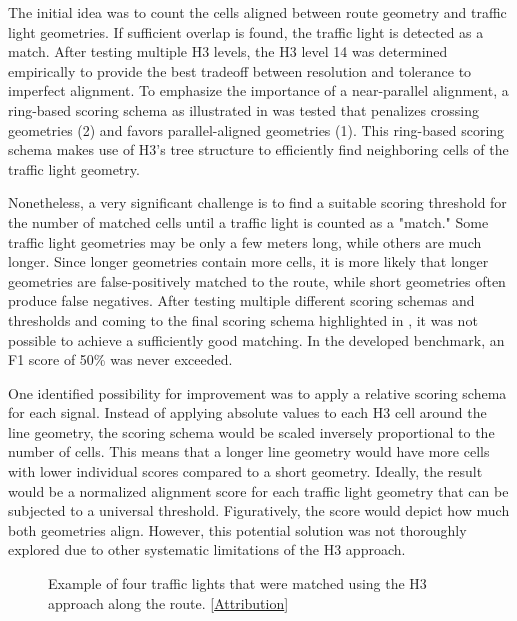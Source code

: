 The initial idea was to count the cells aligned between route geometry and traffic light geometries. If sufficient overlap is found, the traffic light is detected as a match. After testing multiple H3 levels, the H3 level 14 was determined empirically to provide the best tradeoff between resolution and tolerance to imperfect alignment. To emphasize the importance of a near-parallel alignment, a ring-based scoring schema as illustrated in  was tested that penalizes crossing geometries (2) and favors parallel-aligned geometries (1). This ring-based scoring schema makes use of H3's tree structure to efficiently find neighboring cells of the traffic light geometry.

Nonetheless, a very significant challenge is to find a suitable scoring threshold for the number of matched cells until a traffic light is counted as a "match." Some traffic light geometries may be only a few meters long, while others are much longer. Since longer geometries contain more cells, it is more likely that longer geometries are false-positively matched to the route, while short geometries often produce false negatives. After testing multiple different scoring schemas and thresholds and coming to the final scoring schema highlighted in , it was not possible to achieve a sufficiently good matching. In the developed benchmark, an F1 score of 50\% was never exceeded. 

One identified possibility for improvement was to apply a relative scoring schema for each signal. Instead of applying absolute values to each H3 cell around the line geometry, the scoring schema would be scaled inversely proportional to the number of cells. This means that a longer line geometry would have more cells with lower individual scores compared to a short geometry. Ideally, the result would be a normalized alignment score for each traffic light geometry that can be subjected to a universal threshold. Figuratively, the score would depict how much both geometries align. However, this potential solution was not thoroughly explored due to other systematic limitations of the H3 approach.

\begin{figure}[t]
\centering
{}
\caption{Example of four traffic lights that were matched using the H3 approach along the route. [\hyperref[attribution]{Attribution}]}
\label{fig:sg-selection-h3-example}
\end{figure}

